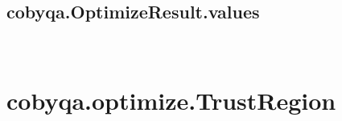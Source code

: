 \documentclass[letterpaper,10pt,english]{sphinxmanual}
\begin{document}
\begin{fulllineitems}
\begin{fulllineitems}
\end{fulllineitems}



\subsection{cobyqa.OptimizeResult.values}
\label{\detokenize{refs/generated/cobyqa.OptimizeResult.values:cobyqa-optimizeresult-values}}\label{\detokenize{refs/generated/cobyqa.OptimizeResult.values::doc}}

\begin{fulllineitems}
\label{\detokenize{refs/generated/cobyqa.OptimizeResult.values:cobyqa.OptimizeResult.values}}~
\end{fulllineitems}


\end{fulllineitems}



\section{cobyqa.optimize.TrustRegion}
\label{\detokenize{refs/generated/cobyqa.optimize.TrustRegion:cobyqa-optimize-trustregion}}\label{\detokenize{refs/generated/cobyqa.optimize.TrustRegion::doc}}
\end{document}

